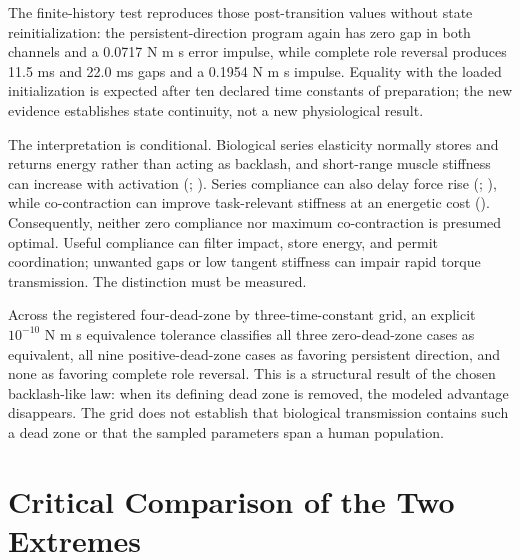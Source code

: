 \documentclass[
  letterpaper,
]{report}
\begin{document}
The finite-history test reproduces those post-transition values without
state reinitialization: the persistent-direction program again has zero
gap in both channels and a 0.0717 N m s error impulse, while complete
role reversal produces 11.5 ms and 22.0 ms gaps and a 0.1954 N m s
impulse. Equality with the loaded initialization is expected after ten
declared time constants of preparation; the new evidence establishes
state continuity, not a new physiological result.

The interpretation is conditional. Biological series elasticity normally
stores and returns energy rather than acting as backlash, and
short-range muscle stiffness can increase with activation
(;
). Series
compliance can also delay force rise (; ), while co-contraction can improve task-relevant
stiffness at an energetic cost (). Consequently, neither zero compliance nor maximum co-contraction
is presumed optimal. Useful compliance can filter impact, store energy,
and permit coordination; unwanted gaps or low tangent stiffness can
impair rapid torque transmission. The distinction must be measured.

Across the registered four-dead-zone by three-time-constant grid, an
explicit \(10^{-10}\) N m s equivalence tolerance classifies all three
zero-dead-zone cases as equivalent, all nine positive-dead-zone cases as
favoring persistent direction, and none as favoring complete role
reversal. This is a structural result of the chosen backlash-like law:
when its defining dead zone is removed, the modeled advantage
disappears. The grid does not establish that biological transmission
contains such a dead zone or that the sampled parameters span a human
population.

\section{Critical Comparison of the Two
Extremes}\label{critical-comparison-of-the-two-extremes}
\end{document}
